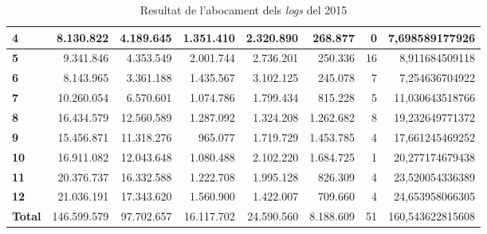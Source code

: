\begin{table}[h!]
\begin{adjustbox}{width=1.5\textwidth, center}
\begin{tabular}{|l|r|r|r|r|r|r|r|}
            \textbf{4}     & 8.130.822   & 4.189.645  & 1.351.410  & 2.320.890  & 268.877   & 0  & 7,698589177926   \\
            \midrule
            \textbf{5}     & 9.341.846   & 4.353.549  & 2.001.744  & 2.736.201  & 250.336   & 16 & 8,911684509118   \\
            \textbf{6}     & 8.143.965   & 3.361.188  & 1.435.567  & 3.102.125  & 245.078   & 7  & 7,254636704922   \\
            \textbf{7}     & 10.260.054  & 6.570.601  & 1.074.786  & 1.799.434  & 815.228   & 5  & 11,030643518766  \\
            \textbf{8}     & 16.434.579  & 12.560.589 & 1.287.092  & 1.324.208  & 1.262.682 & 8  & 19,232649771372  \\
            \midrule
            \textbf{9}     & 15.456.871  & 11.318.276 & 965.077    & 1.719.729  & 1.453.785 & 4  & 17,661245469252  \\
            \textbf{10}    & 16.911.082  & 12.043.648 & 1.080.488  & 2.102.220  & 1.684.725 & 1  & 20,277174679438  \\
            \textbf{11}    & 20.376.737  & 16.332.588 & 1.222.708  & 1.995.128  & 826.309   & 4  & 23,520054336389  \\
            \textbf{12}    & 21.036.191  & 17.343.620 & 1.560.900  & 1.422.007  & 709.660   & 4  & 24,653958066305  \\
            \midrule
            \textbf{Total} & 146.599.579 & 97.702.657 & 16.117.702 & 24.590.560 & 8.188.609 & 51 & 160,543622815608 \\            \bottomrule
        \end{tabular}
    \end{adjustbox}
    \caption{Resultat de l'abocament dels \textit{logs} del 2015}
    \label{tab:logs-table-2016}
\end{table}
